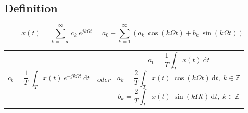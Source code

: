 \documentclass[10pt,a4paper]{article}
\begin{document}
\subsection*{Definition}
\[
	x(t) = \sum_{k=-\infty}^\infty c_k ~ e^{jk\Omega t} = a_0 + \sum_{k=1}^\infty \left( a_k ~ \cos(k \Omega t) + b_k ~ \sin(k \Omega t) \right)
\]

\begin{centering}
\begin{tabular}{ >{\centering\arraybackslash} m{7cm} >{\centering\arraybackslash} m{1cm} >{\centering\arraybackslash} m{7cm} }

\[
	c_k = \frac{1}{T} ~ \int_T x(t) ~ e^{-jk\Omega t} ~ \mathrm dt
\] & \textit{\sffamily oder} & {
\[
	a_0 = \frac{1}{T} \int_T x(t) ~ \mathrm dt
\]
\[
	a_k = \frac{2}{T} \int_T x(t) ~ \cos(k\Omega t) ~ \mathrm dt, ~ k \in \mathbb Z
\]
\[
	b_k = \frac{2}{T} \int_T x(t) ~ \sin(k\Omega t) ~ \mathrm dt, ~ k \in \mathbb Z
\]
} \\
\end{tabular}
\end{centering}
\end{document}
